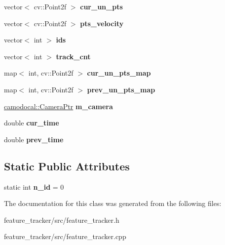 \begin{DoxyCompactItemize}
\mbox{\label{classFeatureTracker_a5a2f5148e56b558c4dc037c6224883c1}} 
vector$<$ cv\+::\+Point2f $>$ {\bfseries cur\+\_\+un\+\_\+pts}
\item 
\mbox{\label{classFeatureTracker_a6fed7826b55d2efedd2344188968f63a}} 
vector$<$ cv\+::\+Point2f $>$ {\bfseries pts\+\_\+velocity}
\item 
\mbox{\label{classFeatureTracker_a42f8e4630d7dd869dac8361b018ac762}} 
vector$<$ int $>$ {\bfseries ids}
\item 
\mbox{\label{classFeatureTracker_af1b0e683ead4ca152f47993e1790d74b}} 
vector$<$ int $>$ {\bfseries track\+\_\+cnt}
\item 
\mbox{\label{classFeatureTracker_a7c093a57f302e31196553a9698bd4559}} 
map$<$ int, cv\+::\+Point2f $>$ {\bfseries cur\+\_\+un\+\_\+pts\+\_\+map}
\item 
\mbox{\label{classFeatureTracker_a2d2ad89dddeb249d850ea8e15150f49d}} 
map$<$ int, cv\+::\+Point2f $>$ {\bfseries prev\+\_\+un\+\_\+pts\+\_\+map}
\item 
\mbox{\label{classFeatureTracker_a69f9531fb56cf0cba822c3e89f5cdc60}} 
\hyperlink{Camera_8h_a9f66c7d396fa23ffb2a4512670a78b84}{camodocal\+::\+Camera\+Ptr} {\bfseries m\+\_\+camera}
\item 
\mbox{\label{classFeatureTracker_aeac3cf97bbebda2f5e5131fc0aedf21e}} 
double {\bfseries cur\+\_\+time}
\item 
\mbox{\label{classFeatureTracker_afe5d3e6234f232d9e448c93f6cdae606}} 
double {\bfseries prev\+\_\+time}
\end{DoxyCompactItemize}
\subsection*{Static Public Attributes}
\begin{DoxyCompactItemize}
\item 
\mbox{\label{classFeatureTracker_a7e05386422889ebf0faaa23078980a1f}} 
static int {\bfseries n\+\_\+id} = 0
\end{DoxyCompactItemize}


The documentation for this class was generated from the following files\+:\begin{DoxyCompactItemize}
\item 
feature\+\_\+tracker/src/feature\+\_\+tracker.\+h\item 
feature\+\_\+tracker/src/feature\+\_\+tracker.\+cpp\end{DoxyCompactItemize}
